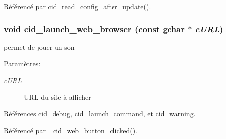 Référencé par cid\_\-read\_\-config\_\-after\_\-update().
\subsubsection{\setlength{\rightskip}{0pt plus 5cm}void cid\_\-launch\_\-web\_\-browser (const gchar $\ast$ {\em cURL})}\label{cid-utilities_8h_05c186e3f1c09623a2149809a55748ef}


permet de jouer un son \begin{Desc}
\item[Paramètres:]
\begin{description}
\item[{\em cURL}]URL du site à afficher \end{description}
\end{Desc}


Références cid\_\-debug, cid\_\-launch\_\-command, et cid\_\-warning.

Référencé par \_\-cid\_\-web\_\-button\_\-clicked().